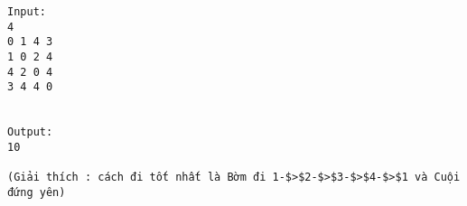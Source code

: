 \begin{verbatim}
Input:
4
0 1 4 3
1 0 2 4
4 2 0 4
3 4 4 0


Output:
10

(Giải thích : cách đi tốt nhất là Bờm đi 1-$>$2-$>$3-$>$4-$>$1 và Cuội đứng yên)
\end{verbatim}